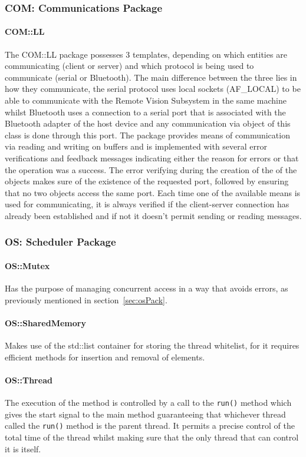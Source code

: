 \subsubsection{COM: Communications Package}
\paragraph{COM::LL}
The COM::LL package possesses 3 templates, depending on which entities are communicating (client or server) and which protocol is being used to communicate (serial or Bluetooth). The main difference between the three lies in how they communicate, the serial protocol uses local sockets (AF\_LOCAL) to be able to communicate with the Remote Vision Subsystem in the same machine whilst Bluetooth uses a connection to a serial port that is associated with the Bluetooth adapter of the host device and any communication via object of this class is done through this port.
The package provides means of communication via reading and writing on buffers and is implemented with several error verifications and feedback messages indicating either the reason for errors or that the operation was a success. The error verifying during the creation of the of the objects makes sure of the existence of the requested port, followed by ensuring that no two objects access the same port. Each time one of the available means is used for communicating, it is always verified if the client-server connection has already been established and if not it doesn't permit sending or reading messages.
%

%
\subsubsection{OS: Scheduler Package}
\paragraph{OS::Mutex}
Has the purpose of managing concurrent access in a way that avoids errors, as previously mentioned in section~\ref{sec:osPack}.
\paragraph{OS::SharedMemory}
Makes use of the std::list container for storing the thread whitelist, for it requires efficient methods for insertion and removal of elements.
\paragraph{OS::Thread}
The execution of the method is controlled by a call to the \texttt{run()} method which gives the start signal to the main method guaranteeing that whichever thread called the \texttt{run()} method is the parent thread. It permits a precise control of the total time of the thread whilst making sure that the only thread that can control it is itself.
%
